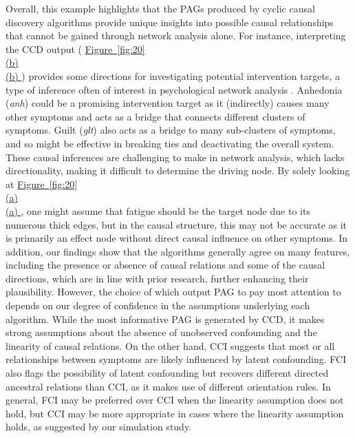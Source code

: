 \documentclass[twoside, 11pt]{article}
\newcommand*{\figref}[2][]{%
  \hyperref[{fig:#2}]{%
    Figure~\ref*{fig:#2}%
    \ifx\\#1\\%
    \else
      #1%
    \fi
  }%
}
\begin{document}
Overall, this example highlights that the PAGs produced by cyclic causal discovery algorithms provide unique insights into possible causal relationships that cannot be gained through network analysis alone. For instance, interpreting the CCD output (\figref[(b)]{20}) provides some directions for investigating potential intervention targets, a type of inference often of interest in psychological network analysis \citep{Ryan2022, ryan2022time, rodebaugh2018does, bringmann2019centrality}. Anhedonia (\textit{anh}) could be a promising intervention target as it (indirectly) causes many other symptoms and acts as a bridge that connects different clusters of symptoms. Guilt (\textit{glt}) also acts as a bridge to many sub-clusters of symptoms, and so might be effective in breaking ties and deactivating the overall system. These causal inferences are challenging to make in network analysis, which lacks directionality, making it difficult to determine the driving node. By solely looking at \figref[(a)]{20}, one might assume that fatigue should be the target node due to its numerous thick edges, but in the causal structure, this may not be accurate as it is primarily an effect node without direct causal influence on other symptoms.
In addition, our findings show that the algorithms generally agree on many features, including the presence or absence of causal relations and some of the causal directions, which are in line with prior research, further enhancing their plausibility.
However, the choice of which output PAG to pay most attention to depends on our degree of confidence in the assumptions underlying each algorithm. While the most informative PAG is generated by CCD, it makes strong assumptions about the absence of unobserved confounding and the linearity of causal relations. On the other hand, CCI suggests that most or all relationships between symptoms are likely influenced by latent confounding. FCI also flags the possibility of latent confounding but recovers different directed ancestral relations than CCI, as it makes use of different orientation rules. In general, FCI may be preferred over CCI when the linearity assumption does not hold, but CCI may be more appropriate in cases where the linearity assumption holds, as suggested by our simulation study. 
\end{document}
